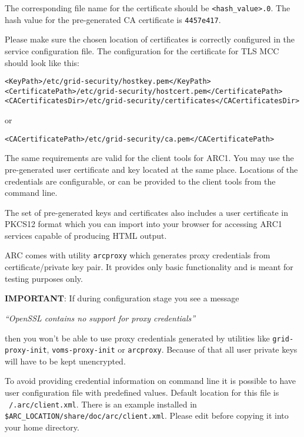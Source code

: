 \documentclass{article}                            %
\begin{document}
The corresponding file name for the certificate should be
\texttt{<hash\_value>.0}. The hash value for the pre-generated CA certificate is
\texttt{4457e417}.

Please make sure the chosen location of certificates is correctly configured in
the service configuration file. The configuration for the certificate for TLS
MCC should look like this:

\begin{lstlisting}
<KeyPath>/etc/grid-security/hostkey.pem</KeyPath>
<CertificatePath>/etc/grid-security/hostcert.pem</CertificatePath>
<CACertificatesDir>/etc/grid-security/certificates</CACertificatesDir>
\end{lstlisting}

or

\begin{lstlisting}
<CACertificatePath>/etc/grid-security/ca.pem</CACertificatePath>
\end{lstlisting}

The same requirements are valid for the client tools for ARC1. You may use the
pre-generated user certificate and key located at the same place. Locations of
the credentials are configurable, or can be provided to the client tools from
the command line.

The set of pre-generated keys and certificates also includes a user certificate
in PKCS12 format which you can import into your browser for accessing ARC1
services capable of producing HTML output.

ARC comes with utility \texttt{arcproxy} which generates proxy credentials from
certificate/private key pair. It provides only basic functionality and is meant
for testing purposes only.

\begin{framed}
\textbf{IMPORTANT}: If during configuration stage you see a message

 \textit{``OpenSSL contains no support for proxy credentials''}

then you won't be able to use proxy credentials generated by utilities
like \texttt{grid-proxy-init}, \texttt{voms-proxy-init} or \texttt{arcproxy}.
Because of that all user private keys will have to be kept unencrypted.
\end{framed}

To avoid providing credential information on command line it is possible to have
user configuration file with predefined values. Default location for this file
is \texttt{~/.arc/client.xml}. There is an example installed in
\verb|$ARC_LOCATION/share/doc/arc/client.xml|. Please edit before copying it
into your home directory.
\end{document}
